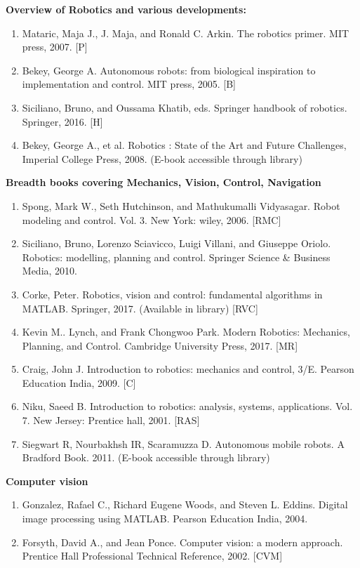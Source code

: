\documentclass[a4paper,11pt]{article}
\begin{document}
\begin{itemize}
\textbf{Overview of Robotics and various developments:}
\begin{enumerate}[label=(\alph*)]
	\item Mataric, Maja J., J. Maja, and Ronald C. Arkin. The robotics primer. MIT press, 2007. [P]
	\item Bekey, George A. Autonomous robots: from biological inspiration to implementation and control. MIT press, 2005. [B] 
	\item Siciliano, Bruno, and Oussama Khatib, eds. Springer handbook of robotics. Springer, 2016. [H]
	\item Bekey, George A., et al. Robotics : State of the Art and Future Challenges, Imperial College Press, 2008. (E-book accessible through library)
\end{enumerate}
\textbf{Breadth books covering Mechanics, Vision, Control, Navigation}
\begin{enumerate}[label=(\alph*)]
	\item Spong, Mark W., Seth Hutchinson, and Mathukumalli Vidyasagar. Robot modeling and control. Vol. 3. New York: wiley, 2006. [RMC]	
	\item Siciliano, Bruno, Lorenzo Sciavicco, Luigi Villani, and Giuseppe Oriolo. Robotics: modelling, planning and control. Springer Science \& Business Media, 2010.
	\item Corke, Peter. Robotics, vision and control: fundamental algorithms in MATLAB. Springer, 2017. (Available in library) [RVC] 
	\item Kevin M.. Lynch, and Frank Chongwoo Park. Modern Robotics: Mechanics, Planning, and Control. Cambridge University Press, 2017. [MR] 	
	\item Craig, John J. Introduction to robotics: mechanics and control, 3/E. Pearson Education India, 2009. [C] 
	\item Niku, Saeed B. Introduction to robotics: analysis, systems, applications. Vol. 7. New Jersey: Prentice hall, 2001. [RAS]			
	\item Siegwart R, Nourbakhsh IR, Scaramuzza D. Autonomous mobile robots. A Bradford Book. 2011. (E-book accessible through library)
\end{enumerate}
\textbf{Computer vision}
\begin{enumerate}[label=(\alph*)]
	\item Gonzalez, Rafael C., Richard Eugene Woods, and Steven L. Eddins. Digital image processing using MATLAB. Pearson Education India, 2004.
	\item Forsyth, David A., and Jean Ponce. Computer vision: a modern approach. Prentice Hall Professional Technical Reference, 2002. [CVM]

\end{enumerate}
\end{itemize}
\end{document}
